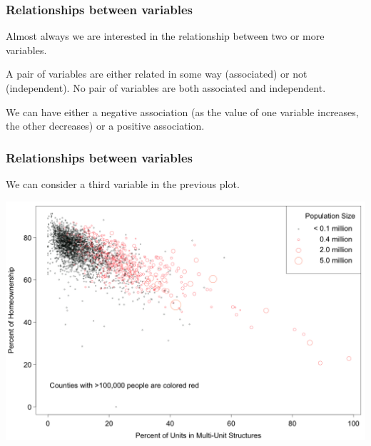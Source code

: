 \documentclass[handout]{beamer}
\newcommand{\blue}[1]{\textcolor{blue2}{#1}}
\begin{document}
\begin{frame}
\frametitle{Relationships between variables}
Almost always we are interested in the relationship between two or more variables.

\vspace{0.25cm}

\pause A pair of variables are either related in some way (\blue{associated}) or not (\blue{independent}).  No pair of variables are both associated and independent.   

\vspace{0.25cm}

\pause We can have either a \blue{negative association} (as the value of one variable increases, the other decreases) or a \blue{positive association}.

\end{frame}


\begin{frame}[fragile]
\frametitle{Relationships between variables}
We can consider a third variable in the previous plot.
\begin{center}
\includegraphics[width=\textwidth]{figure/MHP.png}
\end{center}
\end{frame}
\end{document}
